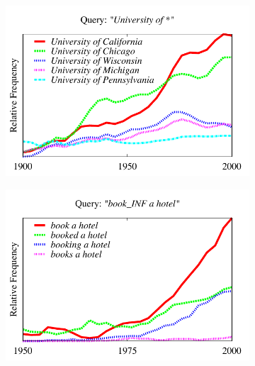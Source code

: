 \documentclass[11pt,a4paper]{article}
\begin{document}
\begin{figure}[!t]
\begin{subfigure}
  \centering
\includegraphics[width=\columnwidth]{graphs/university}\\
\end{subfigure}%
\vspace{-1em}
\begin{subfigure}
\centering
\includegraphics[width=\columnwidth]{graphs/book}\\
\end{subfigure}%
\vspace{-1em}
\begin{subfigure}
\centering

\end{subfigure}
\end{figure}
\end{document}

